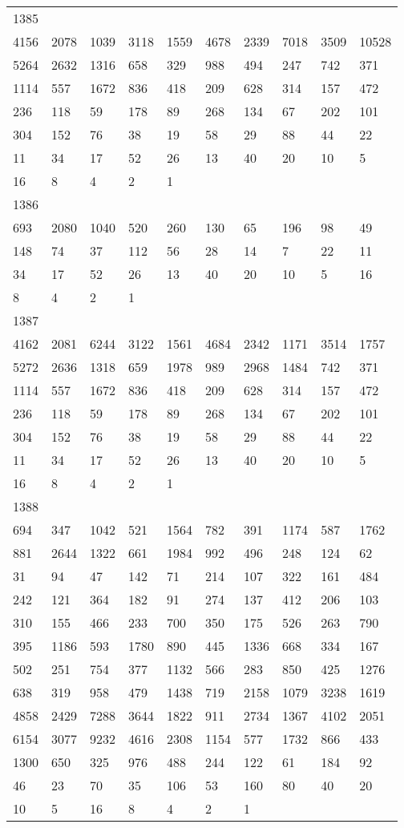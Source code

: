 \begin{longtable}{*{10}{l}}
1385&&&&&&&&&\\
4156& 2078& 1039& 3118& 1559& 4678& 2339& 7018& 3509& 10528\\
5264& 2632& 1316& 658& 329& 988& 494& 247& 742& 371\\
1114& 557& 1672& 836& 418& 209& 628& 314& 157& 472\\
236& 118& 59& 178& 89& 268& 134& 67& 202& 101\\
304& 152& 76& 38& 19& 58& 29& 88& 44& 22\\
11& 34& 17& 52& 26& 13& 40& 20& 10& 5\\
16& 8& 4& 2& 1& \\

1386&&&&&&&&&\\
693& 2080& 1040& 520& 260& 130& 65& 196& 98& 49\\
148& 74& 37& 112& 56& 28& 14& 7& 22& 11\\
34& 17& 52& 26& 13& 40& 20& 10& 5& 16\\
8& 4& 2& 1& \\

1387&&&&&&&&&\\
4162& 2081& 6244& 3122& 1561& 4684& 2342& 1171& 3514& 1757\\
5272& 2636& 1318& 659& 1978& 989& 2968& 1484& 742& 371\\
1114& 557& 1672& 836& 418& 209& 628& 314& 157& 472\\
236& 118& 59& 178& 89& 268& 134& 67& 202& 101\\
304& 152& 76& 38& 19& 58& 29& 88& 44& 22\\
11& 34& 17& 52& 26& 13& 40& 20& 10& 5\\
16& 8& 4& 2& 1& \\

1388&&&&&&&&&\\
694& 347& 1042& 521& 1564& 782& 391& 1174& 587& 1762\\
881& 2644& 1322& 661& 1984& 992& 496& 248& 124& 62\\
31& 94& 47& 142& 71& 214& 107& 322& 161& 484\\
242& 121& 364& 182& 91& 274& 137& 412& 206& 103\\
310& 155& 466& 233& 700& 350& 175& 526& 263& 790\\
395& 1186& 593& 1780& 890& 445& 1336& 668& 334& 167\\
502& 251& 754& 377& 1132& 566& 283& 850& 425& 1276\\
638& 319& 958& 479& 1438& 719& 2158& 1079& 3238& 1619\\
4858& 2429& 7288& 3644& 1822& 911& 2734& 1367& 4102& 2051\\
6154& 3077& 9232& 4616& 2308& 1154& 577& 1732& 866& 433\\
1300& 650& 325& 976& 488& 244& 122& 61& 184& 92\\
46& 23& 70& 35& 106& 53& 160& 80& 40& 20\\
10& 5& 16& 8& 4& 2& 1& \\


\end{longtable}

